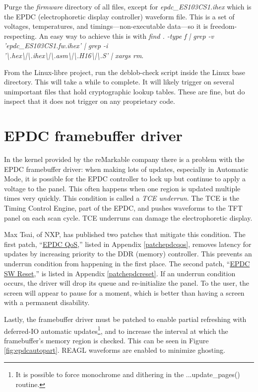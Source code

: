 \documentclass{memoir}
\begin{document}
Purge the \textit{firmware} directory of all files, except for \textit{epdc\_ES103CS1.ihex} which is the EPDC (electrophoretic display controller) waveform file. This is a set of voltages, temperatures, and timings---non-executable data---so it is freedom-respecting. An easy way to achieve this is with \textit{find . -type f | grep -v 'epdc\_ES103CS1.fw.ihex' | grep -i \\'\textbackslash.hex\textbackslash|\textbackslash.ihex\textbackslash|\textbackslash.asm\textbackslash|\textbackslash.H16\textbackslash|\textbackslash.S' | xargs rm}.

From the Linux-libre project, run the deblob-check script inside the Linux base directory. This will take a while to complete. It will likely trigger on several unimportant files that hold cryptographic lookup tables. These are fine, but do inspect that it does not trigger on any proprietary code.

\section{EPDC framebuffer driver}
In the kernel provided by the reMarkable company there is a problem with the EPDC framebuffer driver: when making lots of updates, especially in Automatic Mode, it is possible for the EPDC controller to lock up but continue to apply a voltage to the panel. This often happens when one region is updated multiple times very quickly. This condition is called a \textit{TCE underrun}. The TCE is the Timing Control Engine, part of the EPDC, and pushes waveforms to the TFT panel on each scan cycle. TCE underruns can damage the electrophoretic display.

Max Tsai, of NXP, has published two patches that mitigate this condition. The first patch, ``\href{https://community.nxp.com/docs/DOC-343599}{EPDC QoS},'' listed in Appendix \ref{patchepdcqos}, removes latency for updates by increasing priority to the DDR (memory) controller. This prevents an underrun condition from happening in the first place. The second patch, ``\href{https://community.nxp.com/docs/DOC-343787}{EPDC SW Reset},'' is listed in Appendix \ref{patchepdcreset}. If an underrun condition occurs, the driver will drop its queue and re-initialize the panel. To the user, the screen will appear to pause for a moment, which is better than having a screen with a permanent disability.

Lastly, the framebuffer driver must be patched to enable partial refreshing with deferred-IO automatic updates\footnote{It is possible to force monochrome and dithering in the ...update\_pages() routine.}, and to increase the interval at which the framebuffer's memory region is checked. This can be seen in Figure \ref{fig:epdcautopart}. REAGL waveforms are enabled to minimize ghosting.
\end{document}
